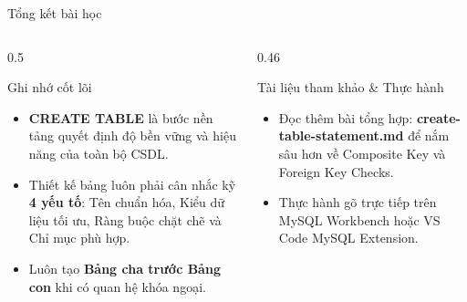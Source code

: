 \documentclass[aspectratio=169,11pt]{beamer}
\newcommand{\kw}[1]{\textcolor{dbblue}{\textbf{#1}}}
\begin{document}
\begin{frame}{Tổng kết bài học}
\begin{columns}[t]
  \begin{column}{0.5\textwidth}
    \begin{block}{Ghi nhớ cốt lõi}
      \begin{itemize}\setlength{\itemsep}{2pt}
        \item \kw{CREATE TABLE} là bước nền tảng quyết định độ bền vững và hiệu năng của toàn bộ CSDL.
        \item Thiết kế bảng luôn phải cân nhắc kỹ \kw{4 yếu tố}: Tên chuẩn hóa, Kiểu dữ liệu tối ưu, Ràng buộc chặt chẽ và Chỉ mục phù hợp.
        \item Luôn tạo \kw{Bảng cha trước Bảng con} khi có quan hệ khóa ngoại.
      \end{itemize}
    \end{block}
  \end{column}
  \begin{column}{0.46\textwidth}
    \begin{exampleblock}{Tài liệu tham khảo \& Thực hành}
      \begin{itemize}\setlength{\itemsep}{2pt}
        \item Đọc thêm bài tổng hợp: \textbf{create-table-statement.md} để nắm sâu hơn về Composite Key và Foreign Key Checks.
        \item Thực hành gõ trực tiếp trên MySQL Workbench hoặc VS Code MySQL Extension.
      \end{itemize}
    \end{exampleblock}
  \end{column}
\end{columns}
\end{frame}
\end{document}
